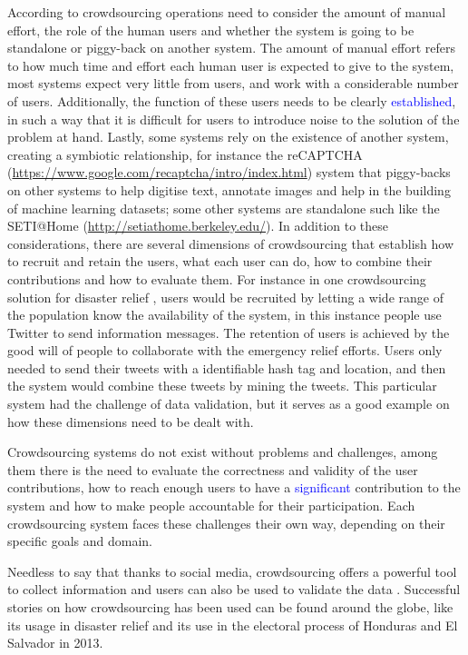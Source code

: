\documentclass[letterpaper,10pt]{article}
\begin{document}
According to \cite{doan2011} crowdsourcing operations need to consider the amount of manual effort, the role of the human users and whether the system is going to be standalone or piggy-back on another system. The amount of manual effort refers to how much time and effort each human user is expected to give to the system, most systems expect very little from users, and work with a considerable number of users. Additionally, the function of these users needs to be clearly \textcolor{blue}{established}, in such a way that it is difficult for users to introduce noise to the solution of the problem at hand. Lastly, some systems rely on the existence of another system, creating a symbiotic relationship, for instance the reCAPTCHA (\url{https://www.google.com/recaptcha/intro/index.html}) system that piggy-backs on other systems to help digitise text, annotate images and help in the building of machine learning datasets; some other systems are standalone such like the SETI@Home (\url{http://setiathome.berkeley.edu/}). In addition to these considerations, there are several dimensions of crowdsourcing that establish how to recruit and retain the users, what each user can do, how to combine their contributions and how to evaluate them. For instance in one crowdsourcing solution for disaster relief \citep{gao2011}, users would be recruited by letting a wide range of the population know the availability of the system, in this instance people use Twitter to send information messages. The retention of users is achieved by the good will of people to collaborate with the emergency relief efforts. Users only needed to send their tweets with a identifiable hash tag and location, and then the system would combine these tweets by mining the tweets. This particular system had the challenge of data validation, but it serves as a good example on how these dimensions need to be dealt with.

Crowdsourcing systems do not exist without problems and challenges, among them there is the need to evaluate the correctness and validity of the user contributions, how to reach enough users to have a \textcolor{blue}{significant} contribution to the system and how to make people accountable for their participation. Each crowdsourcing system faces these challenges their own way, depending on their specific goals and domain.

Needless to say that thanks to social media, crowdsourcing offers a powerful tool to collect information and users can also be used to validate the data \citep{gao2011}. Successful stories on how crowdsourcing has been used can be found around the globe, like its usage in disaster relief \citep{yin2012, gao2011} and its use in the electoral process of Honduras and El Salvador in 2013.
\end{document}
